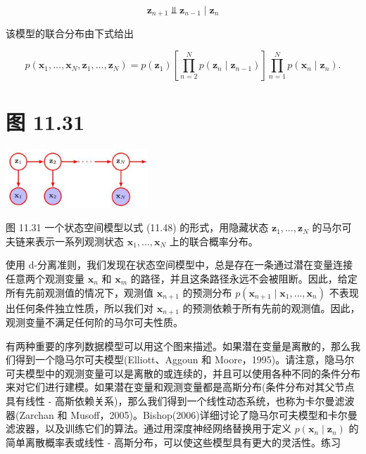 \documentclass[10pt]{report}
\begin{document}
\[
{\mathbf{z}}_{n + 1} ⫫ {\mathbf{z}}_{n - 1} \mid  {\mathbf{z}}_{n} \tag{11.47}
\]

该模型的联合分布由下式给出

\[
p\left( {{\mathbf{x}}_{1},\ldots ,{\mathbf{x}}_{N},{\mathbf{z}}_{1},\ldots ,{\mathbf{z}}_{N}}\right)  = p\left( {\mathbf{z}}_{1}\right) \left\lbrack  {\mathop{\prod }\limits_{{n = 2}}^{N}p\left( {{\mathbf{z}}_{n} \mid  {\mathbf{z}}_{n - 1}}\right) }\right\rbrack  \mathop{\prod }\limits_{{n = 1}}^{N}p\left( {{\mathbf{x}}_{n} \mid  {\mathbf{z}}_{n}}\right) . \tag{11.48}
\]

\section*{图 11.31}

\begin{center}
\includegraphics[max width=0.4\textwidth]{images/0194e279-9b28-703a-88f4-c3ac21e2010d_371_1013_1742_536_222_0.jpg}
\end{center}
\hspace*{3em} 

图 11.31 一个状态空间模型以式 (11.48) 的形式，用隐藏状态 \({\mathbf{z}}_{1},\ldots ,{\mathbf{z}}_{N}\) 的马尔可夫链来表示一系列观测状态 \({\mathbf{x}}_{1},\ldots ,{\mathbf{x}}_{N}\) 上的联合概率分布。

使用 d-分离准则，我们发现在状态空间模型中，总是存在一条通过潜在变量连接任意两个观测变量 \({\mathbf{x}}_{n}\) 和 \({\mathbf{x}}_{m}\) 的路径，并且这条路径永远不会被阻断。因此，给定所有先前观测值的情况下，观测值 \({\mathbf{x}}_{n + 1}\) 的预测分布 \(p\left( {{\mathbf{x}}_{n + 1} \mid  {\mathbf{x}}_{1},\ldots ,{\mathbf{x}}_{n}}\right)\) 不表现出任何条件独立性质，所以我们对 \({\mathbf{x}}_{n + 1}\) 的预测依赖于所有先前的观测值。因此，观测变量不满足任何阶的马尔可夫性质。

有两种重要的序列数据模型可以用这个图来描述。如果潜在变量是离散的，那么我们得到一个隐马尔可夫模型(Elliott、Aggoun 和 Moore，1995)。请注意，隐马尔可夫模型中的观测变量可以是离散的或连续的，并且可以使用各种不同的条件分布来对它们进行建模。如果潜在变量和观测变量都是高斯分布(条件分布对其父节点具有线性 - 高斯依赖关系)，那么我们得到一个线性动态系统，也称为卡尔曼滤波器(Zarchan 和 Musoff，2005)。Bishop(2006)详细讨论了隐马尔可夫模型和卡尔曼滤波器，以及训练它们的算法。通过用深度神经网络替换用于定义 \(p\left( {{\mathbf{x}}_{n} \mid  {\mathbf{z}}_{n}}\right)\) 的简单离散概率表或线性 - 高斯分布，可以使这些模型具有更大的灵活性。练习
\end{document}
